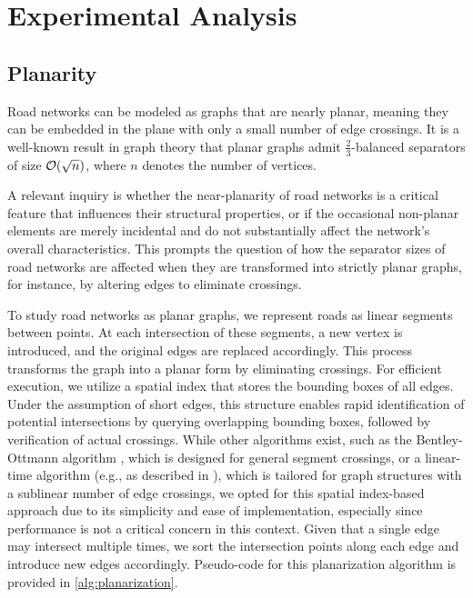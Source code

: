 \chapter{Experimental Analysis} \label{ch:experimental_analysis}

\section{Planarity} \label{sec:approach:planarity}


Road networks can be modeled as graphs that are nearly planar, meaning they can
be embedded in the plane with only a small number of edge crossings. It is a
well-known result in graph theory that planar graphs admit \(\frac23\)-balanced
separators of size \(\mathcal{O}\!\left(\sqrt{n}\right)\), where \(n\) denotes the number of
vertices.

A relevant inquiry is whether the near-planarity of road networks is a critical
feature that influences their structural properties, or if the occasional
non-planar elements are merely incidental and do not substantially affect the
network’s overall characteristics. This prompts the question of how the
separator sizes of road networks are affected when they are transformed into
strictly planar graphs, for instance, by altering edges to eliminate crossings.

To study road networks as planar graphs, we represent roads as linear segments
between points. At each intersection of these segments, a new vertex is
introduced, and the original edges are replaced accordingly. This process
transforms the graph into a planar form by eliminating crossings. For efficient
execution, we utilize a spatial index that stores the bounding boxes of all
edges. Under the assumption of short edges, this structure enables rapid
identification of potential intersections by querying overlapping bounding
boxes, followed by verification of actual crossings. While other algorithms
exist, such as the Bentley-Ottmann algorithm \cite{bentley_algorithms_1979},
which is designed for general segment crossings, or a linear-time algorithm
(e.g., as described in \cite{eppstein_linear-time_2010}), which is tailored for
graph structures with a sublinear number of edge crossings, we opted for this
spatial index-based approach due to its simplicity and ease of implementation,
especially since performance is not a critical concern in this context. Given
that a single edge may intersect multiple times, we sort the intersection
points along each edge and introduce new edges accordingly. Pseudo-code for
this planarization algorithm is provided in \cref{alg:planarization}.

